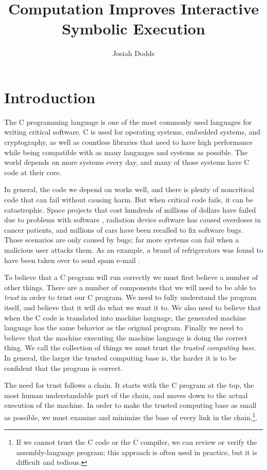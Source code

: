 \documentclass{puthesis}
\author{Josiah Dodds}
\title{Computation Improves Interactive Symbolic Execution}
\begin{document}
\chapter{Introduction}

The C programming language is one of the most commonly used languages
for writing critical software. C is used for operating systems,
embedded systems, and cryptography, as well as countless libraries
that need to have high performance while being compatible with as many
languages and systems as possible. The world depends on more systems
every day, and many of those systems have C code at their core.

In general, the code we depend on works well, and there is plenty of
noncritical code that can fail without causing harm.  But when critical
code fails, it can be catastrophic. Space projects that cost hundreds
of millions of dollars have failed due to problems with software
\cite{polarlander, marsorbit}, radiation device software has caused
overdoses in cancer patients\cite{therac}, and millions of cars have
been recalled to fix software bugs\cite{toyotarecall}. Those scenarios
are only caused by bugs; far more systems can fail when a malicious
user attacks them. As an example, a brand of refrigerators was found
to have been taken over to send spam e-mail \cite{fridgenet}.

To believe that a C program will run correctly we must first believe a
number of other things. There are a number of components that we will
need to be able to \emph{trust} in order to trust our C program. We need
to fully understand the program itself, and believe that it will do
what we want it to. We also need to believe that when
the C code is translated into machine language, the generated machine
language has the same behavior as the original program. Finally we
need to believe that the machine executing the machine language is
doing the correct thing. We call the collection of things we must
trust the \emph{trusted computing base}. In general, the larger the
trusted computing base is, the harder it is to be confident that the
program is correct.

The need for trust follows a chain. It starts with the C program at
the top, the most human understandable part of the chain, and moves
down to the actual execution of the machine. In order to make the
trusted computing base as small as possible, we must examine and
minimize the base of every link in the chain.\footnote{If we cannot
  trust the C code or the C compiler, we can review or verify the
  assembly-language program; this approach is often used in practice,
  but it is difficult and tedious.}.
\end{document}
